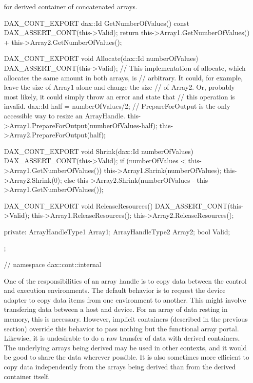 \begin{daxexample}[ex:DerivedArrayContainer]{ for derived container of concatenated arrays.}
{{{{  DAX_CONT_EXPORT
  dax::Id GetNumberOfValues() const {
    DAX_ASSERT_CONT(this->Valid);
    return this->Array1.GetNumberOfValues() + this->Array2.GetNumberOfValues();
  }

  DAX_CONT_EXPORT
  void Allocate(dax::Id numberOfValues) {
    DAX_ASSERT_CONT(this->Valid);
    // This implementation of allocate, which allocates the same amount in both arrays, is
    // arbitrary. It could, for example, leave the size of Array1 alone and change the size
    // of Array2. Or, probably most likely, it could simply throw an error and state that
    // this operation is invalid.
    dax::Id half = numberOfValues/2;
    // PrepareForOutput is the only accessible way to resize an ArrayHandle.
    this->Array1.PrepareForOutput(numberOfValues-half);
    this->Array2.PrepareForOutput(half);
  }

  DAX_CONT_EXPORT
  void Shrink(dax::Id numberOfValues) {
    DAX_ASSERT_CONT(this->Valid);
    if (numberOfValues < this->Array1.GetNumberOfValues())
      {
      this->Array1.Shrink(numberOfValues);
      this->Array2.Shrink(0);
      }
    else
      {
      this->Array2.Shrink(numberOfValues - this->Array1.GetNumberOfValues());
      }
  }

  DAX_CONT_EXPORT
  void ReleaseResources() {
    DAX_ASSERT_CONT(this->Valid);
    this->Array1.ReleaseResources();
    this->Array2.ReleaseResources();
  }

private:
  ArrayHandleType1 Array1;
  ArrayHandleType2 Array2;
  bool Valid;
};

}
}
} // namespace dax::cont::internal
\end{daxexample}

One of the responsibilities of an array handle is to copy data between the
control and execution environments. The default behavior is to request the
device adapter to copy data items from one environment to another. This
might involve transfering data between a host and device. For an array of
data resting in memory, this is necessary. However, implicit containers
(described in the previous section) override this behavior to pass nothing
but the functional array portal. Likewise, it is undesirable to do a raw
transfer of data with derived containers. The underlying arrays being
derived may be used in other contexts, and it would be good to share the
data wherever possible. It is also sometimes more efficient to copy data
independently from the arrays being derived than from the derived container
itself.


